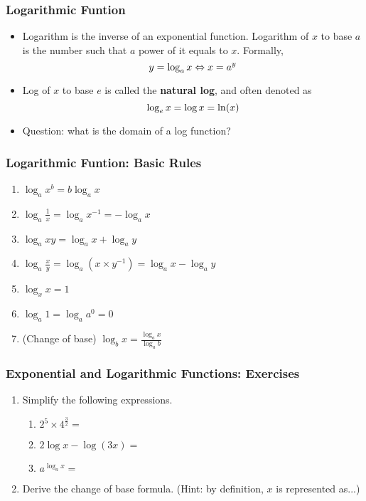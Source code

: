 \documentclass[pdflatex, 12pt]{beamer}
\begin{document}
\begin{frame}
\frametitle{Logarithmic Funtion}
\begin{itemize}
\item Logarithm is the inverse of an exponential function. Logarithm of $x$ to base $a$ is the number such that $a$ power of it equals to $x$. Formally, 
\begin{equation}
y = \log_{a} x \Leftrightarrow x = a^{y} \notag
\end{equation}
\item Log of $x$ to base $e$ is called the \textbf{natural log}, and often denoted as 
\begin{equation}
\log_{e} x = \log x = \mathrm{ln}(x) \notag
\end{equation}
\item Question: what is the domain of a log function?
\end{itemize}
\end{frame}

\begin{frame}
\frametitle{Logarithmic Funtion: Basic Rules}
\begin{enumerate}
\item $\log_{a} x^{b} = b\log_{a} x$
\item $\log_{a} \frac{1}{x} = \log_{a} x^{-1} = -\log_{a} x$
\item $\log_{a} xy = \log_{a} x + \log_{a} y$
\item $\log_{a} \frac{x}{y} = \log_{a} (x \times y^{-1}) = \log_{a} x - \log_{a} y$
\item $\log_{x} x = 1$
\item $\log_{a} 1 = \log_{a} a^{0} = 0$
\item (Change of base) $\log_{b} x = \frac{\log_{a} x}{\log_{a} b}$
\end{enumerate}
\end{frame}

\begin{frame}
\frametitle{Exponential and Logarithmic Functions: Exercises}
\begin{enumerate}
\item Simplify the following expressions.
 \begin{enumerate}
 \item $2^{5} \times 4^{\frac{3}{2}} = $
 \item $2\log x - \log(3x) = $
 \item $a^{\log_{a} x} = $
 \end{enumerate}
\vspace{0.4cm}
\item Derive the change of base formula. (Hint: by definition, $x$ is represented as...)
\end{enumerate}
\end{frame}
\end{document}
